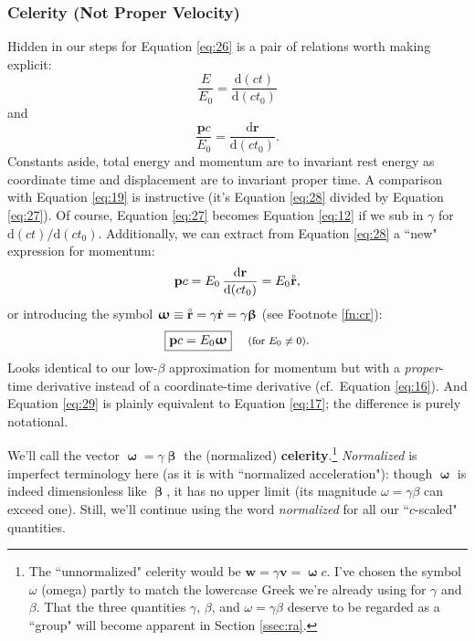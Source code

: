 \documentclass[12pt]{article}
\renewcommand{\mathring}[1]{\accentset{\circ}{#1}}
\renewcommand{\vv}[1]{\mathbf{#1}}
\newcommand{\dd}[1]{\mathrm{d}#1}
\newcommand{\vvbeta}{\bm{\upbeta}}
\newcommand{\vvomega}{\bm{\upomega}}
\begin{document}
\subsubsection{Celerity (Not Proper Velocity)}\label{sssec:ce}

Hidden in our steps for Equation \ref{eq:26} is a pair of relations worth making explicit:
\begin{equation}\label{eq:27}
\dfrac{E}{E_0} = \dfrac{\dd (ct)}{\dd (c t_0)}
\end{equation}
and
\begin{equation}\label{eq:28}
\dfrac{\vv p c}{E_0} = \dfrac{\dd \vv r}{\dd (c t_0)} .
\end{equation}
Constants aside, total energy and momentum are to invariant rest energy as coordinate time and displacement are to invariant proper time. A comparison with Equation \ref{eq:19} is instructive (it's Equation \ref{eq:28} divided by Equation \ref{eq:27}). Of course, Equation \ref{eq:27} becomes Equation \ref{eq:12} if we sub in $\gamma$ for $\dd (ct) / \dd (c t_0)$. Additionally, we can extract from Equation \ref{eq:28} a ``new" expression for momentum:
\begin{equation*}
\vv p c = E_0 \, \dfrac{\dd \vv r}{\dd (c t_0)} = E_0 \mkern.5mu \mathring{\vv r},
\end{equation*}
or introducing the symbol $\vvomega \equiv \mathring{\vv r} = \gamma \dot{\vv r} = \gamma \vvbeta$ (see Footnote \ref{fn:cr}):
\begin{equation}\label{eq:29}
\boxed{\vv p c = E_0 \vvomega} \quad \textrm{\footnotesize{ (for $E_0 \neq 0$)}}.
\end{equation}
Looks identical to our low-$\beta$ approximation for momentum but with a \emph{proper}-time derivative instead of a coordinate-time derivative (cf.\ Equation \ref{eq:16}). And Equation \ref{eq:29} is plainly equivalent to Equation \ref{eq:17}; the difference is purely notational.

We'll call the vector $\vvomega = \gamma \vvbeta$ the (normalized) \textbf{celerity}.\footnote{The ``unnormalized" celerity would be $\vv w = \gamma \vv v = \vvomega c$. I've chosen the symbol $\omega$ (omega) partly to match the lowercase Greek we're already using for $\gamma$ and $\beta$. That the three quantities $\gamma$, $\beta$, and $\omega = \gamma \beta$ deserve to be regarded as a ``group" will become apparent in Section \ref{ssec:ra}.} \emph{Normalized} is imperfect terminology here (as it is with ``normalized acceleration"): though $\vvomega$ is indeed dimensionless like $\vvbeta$, it has no upper limit (its magnitude $\omega = \gamma \beta$ can exceed one). Still, we'll continue using the word \emph{normalized} for all our ``$c$-scaled" quantities.
\end{document}
